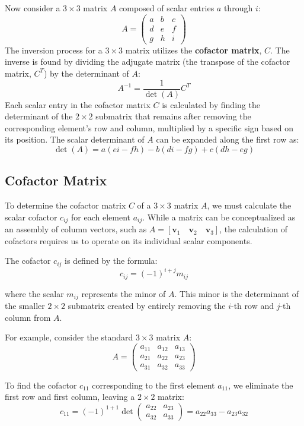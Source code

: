 \documentclass[10pt, a4paper]{report}
\begin{document}
\bigskip
Now consider a $3 \times 3$ matrix $A$ composed of scalar entries $a$ through $i$:
$$
A = \begin{pmatrix} a & b & c \\ d & e & f \\ g & h & i \end{pmatrix}
$$
The inversion process for a $3 \times 3$ matrix utilizes the \textbf{cofactor matrix}, $C$. The inverse is found by dividing the adjugate matrix (the transpose of the cofactor matrix, $C^T$) by the determinant of $A$:
$$
A^{-1} = \frac{1}{\det(A)} C^T
$$
Each scalar entry in the cofactor matrix $C$ is calculated by finding the determinant of the $2 \times 2$ submatrix that remains after removing the corresponding element's row and column, multiplied by a specific sign based on its position. The scalar determinant of $A$ can be expanded along the first row as:
$$
\det(A) = a(ei - fh) - b(di - fg) + c(dh - eg)
$$
\subsection*{Cofactor Matrix}
To determine the cofactor matrix $C$ of a $3 \times 3$ matrix $A$, we must calculate the scalar cofactor $c_{ij}$ for each element $a_{ij}$. While a matrix can be conceptualized as an assembly of column vectors, such as $A = [\mathbf{v}_1 \quad \mathbf{v}_2 \quad \mathbf{v}_3]$, the calculation of cofactors requires us to operate on its individual scalar components.

The cofactor $c_{ij}$ is defined by the formula:
\[ c_{ij} = (-1)^{i+j} m_{ij} \]

where the scalar $m_{ij}$ represents the minor of $A$. This minor is the determinant of the smaller $2 \times 2$ submatrix created by entirely removing the $i$-th row and $j$-th column from $A$.

For example, consider the standard $3 \times 3$ matrix $A$:
\[ A = \begin{pmatrix} a_{11} & a_{12} & a_{13} \\ a_{21} & a_{22} & a_{23} \\ a_{31} & a_{32} & a_{33} \end{pmatrix} \]

To find the cofactor $c_{11}$ corresponding to the first element $a_{11}$, we eliminate the first row and first column, leaving a $2 \times 2$ matrix:
\[ c_{11} = (-1)^{1+1} \det\begin{pmatrix} a_{22} & a_{23} \\ a_{32} & a_{33} \end{pmatrix} = a_{22}a_{33} - a_{23}a_{32} \]
\end{document}
